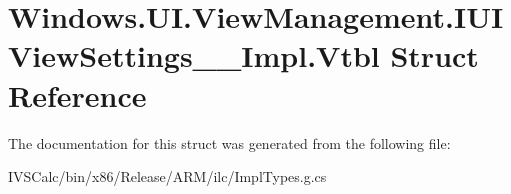 \hypertarget{struct_windows_1_1_u_i_1_1_view_management_1_1_i_u_i_view_settings_____impl_1_1_vtbl}{}\section{Windows.\+U\+I.\+View\+Management.\+I\+U\+I\+View\+Settings\+\_\+\+\_\+\+Impl.\+Vtbl Struct Reference}
\label{struct_windows_1_1_u_i_1_1_view_management_1_1_i_u_i_view_settings_____impl_1_1_vtbl}


The documentation for this struct was generated from the following file\+:\begin{DoxyCompactItemize}
\item 
I\+V\+S\+Calc/bin/x86/\+Release/\+A\+R\+M/ilc/Impl\+Types.\+g.\+cs\end{DoxyCompactItemize}

